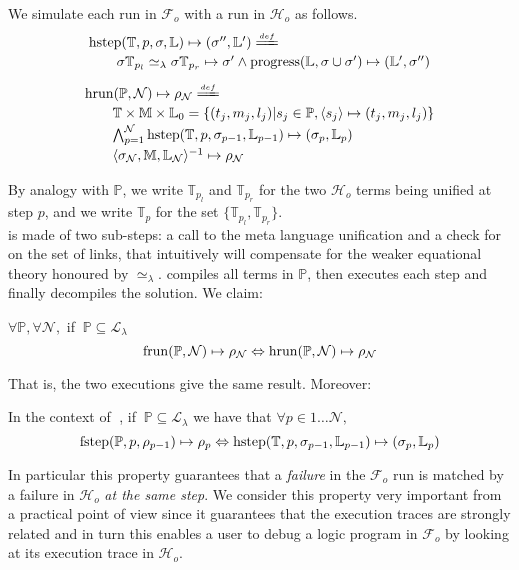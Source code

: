 \documentclass[sigconf,natbib=false,review]{acmart}
\newcommand{\UnifRel}{\ensuremath{\simeq}}
\newcommand{\Ue}{\ensuremath{\UnifRel_\lambda}\xspace}
\newcommand{\llambda}{\ensuremath{\mathcal{L}_\lambda}\xspace}
\newcommand{\Fo}{\ensuremath{\mathcal{F}_{\!o}\xspace}} %
\newcommand{\Ho}{\ensuremath{\mathcal{H}_o}\xspace}
\newcommand{\linkStore}{\ensuremath{\mathbb{L}}\xspace}
\newcommand{\mapStore}{\ensuremath{\mathbb{M}}\xspace}
\newcommand{\foUnifPb}{\ensuremath{\mathbb{P}}\xspace}
\newcommand{\hoUnifPb}{\ensuremath{\mathbb{T}}\xspace}
\begin{document}
We simulate each run in \Fo{} with a run in \Ho as follows.
$$
\begin{array}{l}
\stepH{\hoUnifPb}{p}{\sigma}{\linkStore}{\sigma''}{\linkStore'} \deff\vspace{2pt}\\
  \qquad\stepHD{\hoUnifPb}{p}{\sigma}{\sigma'}{\sigma''}{\linkStore}\vspace{2pt}\\
\end{array}
$$
$$
\begin{array}{l}
  \runH{\foUnifPb}{\mathcal{N}}{\rho} \deff \vspace{2pt}\\
  \qquad \hoUnifPb \times \mapStore \times \linkStore_0 = \{ (t_j,m_j,l_j) | s_j \in \foUnifPb, \C{s_j}{t_j}{m_j}{l_j} \}\vspace{2pt}\\
  \qquad \runHD{\hoUnifPb}{\mathcal{N}}{\linkStore}\vspace{2pt}\\
  \qquad \D{\sigma_{\mathcal{N}}}{\mapStore}{\linkStore_{\mathcal{N}}}{\rho_{\mathcal{N}}}
\end{array}
$$

\noindent
By analogy with \foUnifPb, we write $\hoUnifPb_{p_l}$ and $\hoUnifPb_{p_r}$
for the two \Ho{} terms being unified at step $p$, and we write $\hoUnifPb_p$
for the set $\{ \hoUnifPb_{p_l}, \hoUnifPb_{p_r} \}$.\\
\hstep{} is made of two sub-steps: a call to the meta language
unification and a check for \progress{} on the set of links, that intuitively
will compensate for the weaker equational theory honoured by \Ue.
\hrun{} compiles all terms in \foUnifPb{}, then executes each step and
finally decompiles the solution.
We claim:

\begin{proposition}[Simulation]\label{prop:simulation}
$\forall \foUnifPb, \forall \mathcal{N},$ if $~\foUnifPb \subseteq \llambda$
$$
  \runF{\foUnifPb}{\mathcal{N}}{\rho}
  \Leftrightarrow
  \runH{\foUnifPb}{\mathcal{N}}{\rho}
$$
\end{proposition}

\noindent
That is, the two executions give the same result. Moreover:

\begin{proposition}\label{prop:fidelity}
In the context of$\;$ \hrun, if $~\foUnifPb \subseteq \llambda$ we have that
$\forall p \in 1 \ldots \mathcal{N},$
$$
\stepF{\foUnifPb}{p}{\rho_{p-1}}{\rho_p}
\Leftrightarrow
\stepH{\hoUnifPb}{p}{\sigma_{p-1}}{\linkStore_{p-1}}{\sigma_p}{\linkStore_p}
$$
\end{proposition}
\noindent
In particular this property guarantees that a \emph{failure} in the \Fo{} run
is matched by a failure in \Ho{} \emph{at the same step}. We consider this
property very important from a practical point of view since it guarantees
that the execution traces are strongly related and in turn this enables a user
to debug a logic program in \Fo{} by looking at its execution trace in
\Ho{}.
\end{document}

